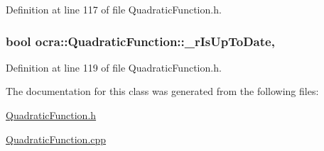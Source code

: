 Definition at line 117 of file Quadratic\+Function.\+h.

\subsubsection[{\texorpdfstring{\+\_\+r\+Is\+Up\+To\+Date}{_rIsUpToDate}}]{\setlength{\rightskip}{0pt plus 5cm}bool ocra\+::\+Quadratic\+Function\+::\+\_\+r\+Is\+Up\+To\+Date\hspace{0.3cm}{\ttfamily [mutable]}, {\ttfamily [protected]}}\hypertarget{classocra_1_1QuadraticFunction_a9862b46e064bccd9e83b10e9ceb4d2f0}{}\label{classocra_1_1QuadraticFunction_a9862b46e064bccd9e83b10e9ceb4d2f0}


Definition at line 119 of file Quadratic\+Function.\+h.



The documentation for this class was generated from the following files\+:\begin{DoxyCompactItemize}
\item 
\hyperlink{QuadraticFunction_8h}{Quadratic\+Function.\+h}\item 
\hyperlink{QuadraticFunction_8cpp}{Quadratic\+Function.\+cpp}\end{DoxyCompactItemize}
